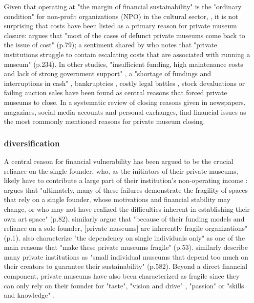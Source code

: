 \documentclass[12pt]{article}
\begin{document}
Given that operating at "the margin of financial sustainability" is the "ordinary condition" for non-profit organizations (NPO) in the cultural sector, \parencite[p.2]{Licci_BaraldiBonini_2024_sustainability}, it is not surprising that costs have been listed as a primary reason for private museum closure:
\textcite{Adam_2021_rise} argues that "most of the cases of defunct private museums come back to the issue of cost" (p.79); a sentiment shared by \textcite{Walker_2019_collector} who notes that "private institutions struggle to contain escalating costs that are associated with running a museum" (p.234).
In other studies, "insufficient funding, high maintenance costs and lack of strong government support" \parencite[p.7]{Zennaro_2017_shanghai}, a "shortage of fundings and interruptions in cash" \parencite[p.45]{Song_2008_private}, bankruptcies \parencite{Velthuis_Gera_2024_fragility,Liu_2019_identities,DeNigris_2018_museums}, costly legal battles \parencite{Velthuis_Gera_2024_fragility}, stock devaluations \parencite{Walker_2019_collector} or failing auction sales \parencite{Bechtler_Imhof_2018_future} have been found as central reasons that forced private museums to close.
In a systematic review of closing reasons given in newspapers, magazines, social media accounts and personal exchanges, \textcite{Velthuis_Gera_2024_fragility} find financial issues as the most commonly mentioned reasons for private museum closing.
\subsubsection*{diversification}




A central reason for financial vulnerability has been argued to be the crucial reliance on the single founder, who, as the initiators of their private museums, likely have to contribute a large part of their institution's non-operating income \parencite{Frey_Meier_2002_beyeler}:
\textcite{Adam_2021_rise} argues that "ultimately, many of these failures demonstrate the fragility of spaces that rely on a single founder, whose motivations and financial stability may change, or who may not have realized the difficulties inherent in establishing their own art space" (p.82).
\textcite{Velthuis_Gera_2024_fragility} similarly argue that "because of their funding models and reliance on a sole founder, [private museums] are inherently fragile organizations" (p.1).
\textcite{Bechtler_Imhof_2018_future} also characterize "the dependency on single individuals only" as one of the main reasons that "make these private museums fragile" (p.53).
\textcite{StylianouLambert_etal_2014_museums} similarly describe many private institutions as "small individual museums that depend too much on their creators to guarantee their sustainability" (p.582).
Beyond a direct financial component, private museums have also been characterized as fragile since they can only rely on their founder for "taste", "vision and drive" \parencite[p.77]{Adam_2021_rise}, "passion" \parencite[p.234]{Walker_2019_collector} or "skills and knowledge" \parencite[p.580]{StylianouLambert_etal_2014_museums}.
\end{document}
